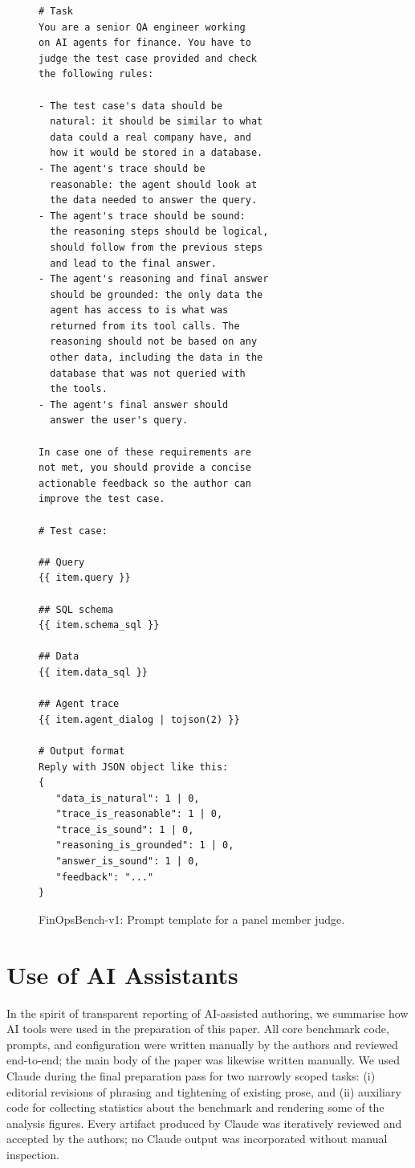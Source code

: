\documentclass[11pt]{article}
\newcommand{\synthsubset}{FinOpsBench-v1}\xspace
\begin{document}
\begin{figure}[t]
\small\centering
\begin{verbatim}
# Task
You are a senior QA engineer working
on AI agents for finance. You have to 
judge the test case provided and check 
the following rules:

- The test case's data should be 
  natural: it should be similar to what 
  data could a real company have, and 
  how it would be stored in a database.
- The agent's trace should be 
  reasonable: the agent should look at 
  the data needed to answer the query.
- The agent's trace should be sound: 
  the reasoning steps should be logical, 
  should follow from the previous steps 
  and lead to the final answer.
- The agent's reasoning and final answer 
  should be grounded: the only data the 
  agent has access to is what was 
  returned from its tool calls. The 
  reasoning should not be based on any 
  other data, including the data in the 
  database that was not queried with 
  the tools.
- The agent's final answer should 
  answer the user's query.

In case one of these requirements are 
not met, you should provide a concise
actionable feedback so the author can 
improve the test case.

# Test case:

## Query
{{ item.query }}

## SQL schema
{{ item.schema_sql }}

## Data
{{ item.data_sql }}

## Agent trace
{{ item.agent_dialog | tojson(2) }}

# Output format
Reply with JSON object like this:
{
   "data_is_natural": 1 | 0,
   "trace_is_reasonable": 1 | 0,
   "trace_is_sound": 1 | 0,
   "reasoning_is_grounded": 1 | 0,
   "answer_is_sound": 1 | 0,
   "feedback": "..."
}
\end{verbatim}
\caption{\synthsubset: Prompt template for a 
panel
member judge.}
\label{fig:judge-prompt}
\end{figure}

\section{Use of AI Assistants}
\label{app:ai_usage}

In the spirit of transparent reporting of AI-assisted authoring, we summarise how AI tools were used in the preparation of this paper. All core benchmark code, prompts, and configuration were written manually by the authors and reviewed end-to-end; the main body of the paper was likewise written manually. We used Claude \citep{anthropic2024claude3} during the final preparation pass for two narrowly scoped tasks: (i) editorial revisions of phrasing and tightening of existing prose, and (ii) auxiliary code for collecting statistics about the benchmark and rendering some of the analysis figures. Every artifact produced by Claude was iteratively reviewed and accepted by the authors; no Claude output was incorporated without manual inspection.
\end{document}
